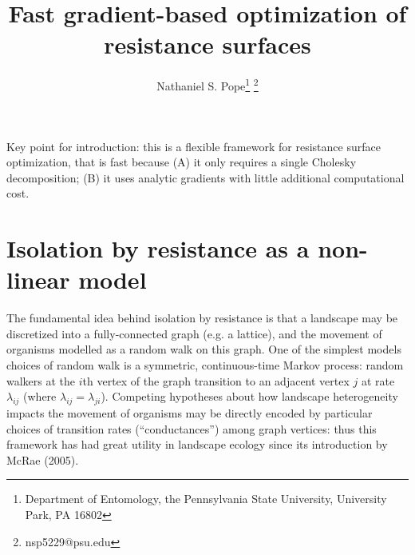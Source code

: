 \documentclass[11pt]{article}
\title{Fast gradient-based optimization of resistance surfaces}
\author{Nathaniel S. Pope\footnote{Department of Entomology, the Pennsylvania State University, University Park, PA 16802} \footnote{nsp5229@psu.edu}}
\date{}
\begin{document}
\maketitle

Key point for introduction: this is a flexible framework for resistance surface optimization,
that is fast because (A) it only requires a single Cholesky decomposition; (B) it uses analytic
gradients with little additional computational cost.

\section{Isolation by resistance as a non-linear model}

The fundamental idea behind isolation by resistance is that a landscape may be
discretized into a fully-connected graph (e.g. a lattice), and the movement of
organisms modelled as a random walk on this graph. One of the simplest models
choices of random walk is a symmetric, continuous-time Markov process: random
walkers at the $i$th vertex of the graph transition to an adjacent vertex $j$
at rate $\lambda_{ij}$ (where $\lambda_{ij} = \lambda_{ji}$). Competing
hypotheses about how landscape heterogeneity impacts the movement of organisms
may be directly encoded by particular choices of transition rates
(``conductances'') among graph vertices: thus this framework has had great
utility in landscape ecology since its introduction by McRae (2005).
\end{document}
